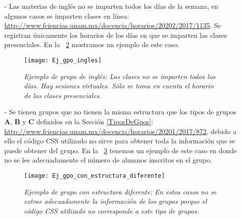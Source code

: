\begin{itemize}
En la \figurename{~\ref{horariosMultiples}} tenemos un ejemplo de este caso en donde el profesor imparte su clase los lunes, miércoles y viernes de 13-14hrs en el salón O215, hay una ayudantía los martes y jueves de 13-14hrs en el salón O215 y otra ayudantía los martes de 11-13hrs en el salón 304 (Yelizcalli). Se considera que esta materia inicia a las 13hrs y se imparte en el salón O215.

\begin{figure}[H]
\centering
\texttt{[image: Ej\_gpo\_horarios\_multiples]} %
\caption[\textit{Ejemplo de grupo con horarios múltiples}]{\textit{Ejemplo de grupo con horarios múltiples: En estos grupos sólo se toman en cuenta los horarios y salones en los que los profesores imparten clase.}}\label{horariosMultiples}
\end{figure}

\item[-] Las materias de inglés no se imparten todos los días de la semana, en algunos casos se imparten clases en línea: \url{http://www.fciencias.unam.mx/docencia/horarios/20202/2017/1135}. Se registran únicamente los horarios de los días en que se imparten las clases presenciales. En la \figurename{~\ref{casoIngles}} mostramos un ejemplo de este caso.

\begin{figure}[H]
\centering
\texttt{[image: Ej\_gpo\_ingles]} %
\caption[\textit{Ejemplo de grupo de inglés}]{\textit{Ejemplo de grupo de inglés: Las clases no se imparten todos los días. Hay sesiones virtuales. Sólo se toma en cuenta el horario de las clases presenciales.}}\label{casoIngles}
\end{figure}

\item[-] Se tienen grupos que no tienen la misma estructura que los tipos de grupos \textbf{A}, \textbf{B} y \textbf{C} definidos en la Sección \ref{TiposDeGpos}: \url{http://www.fciencias.unam.mx/docencia/horarios/20201/2017/872}, debido a ello el código CSS utilizado no sirve para obtener toda la información que se puede obtener del grupo. En la \figurename{~\ref{GpoEstructuraDiferente}} tenemos un ejemplo de este caso en donde no se lee adecuadamente el número de alumnos inscritos en el grupo.

\begin{figure}[H]
\centering
\texttt{[image: Ej\_gpo\_con\_estructura\_diferente]} %
\caption[\textit{Ejemplo de grupo con estructura diferente}]{\textit{Ejemplo de grupo con estructura diferente: En estos casos no se extrae adecuadamente la información de los grupos porque el código CSS utilizado no corresponde a este tipo de grupos.}}\label{GpoEstructuraDiferente}
\end{figure}

\end{itemize}